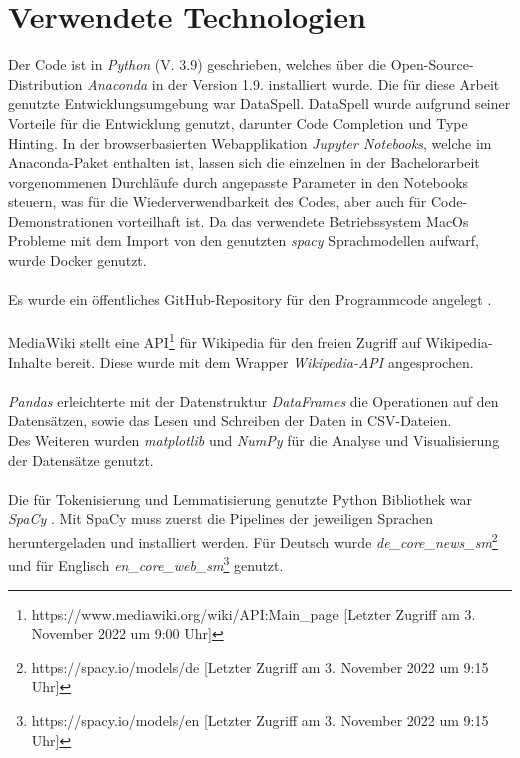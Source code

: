 \documentclass[ngerman]{ttlab-qualify}
\begin{document}
\section{Verwendete Technologien} \label{Implementierung}
Der Code ist in \textit{Python} (V. 3.9) geschrieben, welches über die Open-Source-Distribution \textit{Anaconda} in der Version 1.9. installiert wurde. Die für diese Arbeit genutzte Entwicklungsumgebung war DataSpell. DataSpell wurde aufgrund seiner Vorteile für die Entwicklung genutzt, darunter Code Completion und Type Hinting. In der browserbasierten Webapplikation \textit{Jupyter Notebooks}, welche im Anaconda-Paket enthalten ist, lassen sich die einzelnen in der Bachelorarbeit vorgenommenen Durchläufe durch angepasste Parameter in den Notebooks steuern, was für die Wiederverwendbarkeit des Codes, aber auch für Code-Demonstrationen vorteilhaft ist. Da das verwendete Betriebssystem MacOs Probleme mit dem Import von den genutzten \textit{spacy} Sprachmodellen aufwarf, wurde Docker genutzt.\\ 
\\
Es wurde ein öffentliches GitHub-Repository für den Programmcode angelegt \parencite{Hassibi_Multi-_und_Monolinguale_2022}.\\
\\
MediaWiki stellt eine API\footnote{https://www.mediawiki.org/wiki/API:Main\_page [Letzter Zugriff am 3. November 2022 um 9:00 Uhr]} für Wikipedia für den freien Zugriff auf Wikipedia-Inhalte bereit. Diese wurde mit dem Wrapper \textit{Wikipedia-API} \parencite{wiki_wrapper} angesprochen.\\
\\
\textit{Pandas} \parencite{mckinney-proc-scipy-2010} erleichterte mit der Datenstruktur \textit{DataFrames} die Operationen auf den Datensätzen, sowie das Lesen und Schreiben der Daten in CSV-Dateien.\\
Des Weiteren wurden \textit{matplotlib} \parencite{Hunter:2007} und \textit{NumPy} \parencite{harris2020array} für die Analyse und Visualisierung der Datensätze genutzt.\\
\\
Die für Tokenisierung und Lemmatisierung genutzte Python Bibliothek war \textit{SpaCy} \parencite{spacy}. Mit SpaCy muss zuerst die Pipelines der jeweiligen Sprachen heruntergeladen und installiert werden. Für Deutsch wurde \textit{de\_core\_news\_sm}\footnote{https://spacy.io/models/de [Letzter Zugriff am 3. November 2022 um 9:15 Uhr]} und für Englisch \textit{en\_core\_web\_sm}\footnote{https://spacy.io/models/en [Letzter Zugriff am 3. November 2022 um 9:15 Uhr]} genutzt.\\
\end{document}
